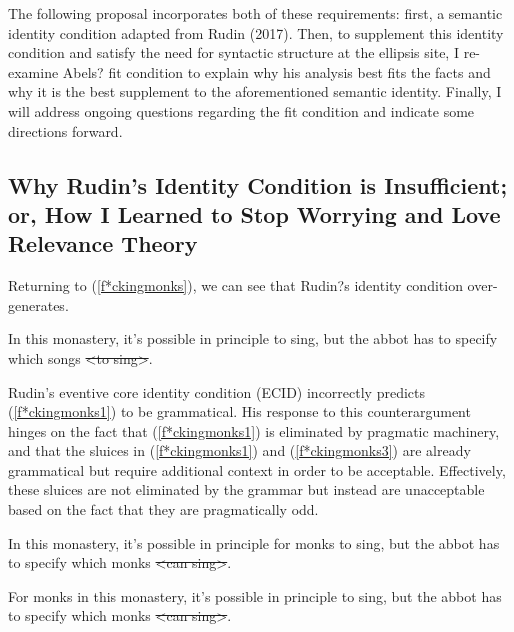 \documentclass{turabian-researchpaper}
\begin{document}
The following proposal incorporates both of these requirements: first, a semantic identity condition adapted from Rudin (2017). Then, to supplement this identity condition and satisfy the need for syntactic structure at the ellipsis site, I re-examine Abels? fit condition to explain why his analysis best fits the facts and why it is the best supplement to the aforementioned semantic identity. Finally, I will address ongoing questions regarding the fit condition and indicate some directions forward.  

\subsection{Why Rudin's Identity Condition is Insufficient; or, How I Learned to Stop Worrying and Love Relevance Theory } 
Returning to (\ref{f*ckingmonks}), we can see that Rudin?s identity condition over-generates. 
\begin{exe}
\begin{xlist}
\ex In this monastery, it's possible in principle to sing, but the abbot has to specify which songs \sout{\textless to sing\textgreater}.
\end{xlist}
\end{exe}

Rudin's eventive core identity condition (ECID) incorrectly predicts (\ref{f*ckingmonks1}) to be grammatical. His response to this counterargument hinges on the fact that (\ref{f*ckingmonks1}) is eliminated by pragmatic machinery, and that  the sluices in (\ref{f*ckingmonks1}) and (\ref{f*ckingmonks3}) are already grammatical but require additional context in order to be acceptable. Effectively, these sluices are not eliminated by the grammar but instead are unacceptable based on the fact that they are pragmatically odd. 

\begin{exe}
 In this monastery, it's possible in principle for monks to sing, but the abbot has to specify which monks \sout{\textless can sing\textgreater}.
\end{exe}
\begin{exe}
 For monks in this monastery, it's possible in principle to sing, but the abbot has to specify which monks \sout{\textless can sing\textgreater}.
\end{exe}
\end{document}
